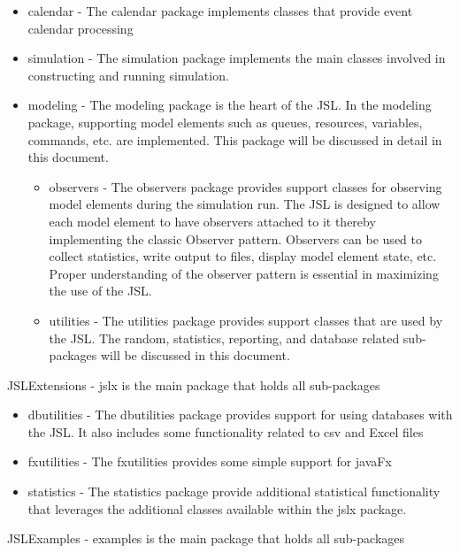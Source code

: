 \documentclass[
]{book}
\providecommand{\tightlist}{%
  \setlength{\itemsep}{0pt}\setlength{\parskip}{0pt}}
\theoremstyle{definition}
\theoremstyle{definition}
\theoremstyle{definition}
\theoremstyle{definition}
\theoremstyle{remark}
\begin{document}
\begin{itemize}
\tightlist
\item
  calendar - The calendar package implements classes that provide event calendar processing
\item
  simulation - The simulation package implements the main classes involved in constructing and running simulation.
\item
  modeling - The modeling package is the heart of the JSL. In the modeling package, supporting model elements such as queues, resources, variables, commands, etc. are implemented. This package will be discussed in detail in this document.

  \begin{itemize}
  \tightlist
  \item
    observers - The observers package provides support classes for observing model elements during the simulation run. The JSL is designed to allow each model element to have observers attached to it thereby implementing the classic Observer pattern. Observers can be used to collect statistics, write output to files, display model element state, etc. Proper understanding of the observer pattern is essential in maximizing the use of the JSL.
  \item
    utilities - The utilities package provides support classes that are used by the JSL. The random, statistics, reporting, and database related sub-packages will be discussed in this document.
  \end{itemize}
\end{itemize}

JSLExtensions - jslx is the main package that holds all sub-packages

\begin{itemize}
\tightlist
\item
  dbutilities - The dbutilities package provides support for using databases with the JSL. It also includes some functionality related to csv and Excel files
\item
  fxutilities - The fxutilities provides some simple support for javaFx
\item
  statistics - The statistics package provide additional statistical functionality that leverages the additional classes available within the jslx package.
\end{itemize}

JSLExamples - examples is the main package that holds all sub-packages
\end{document}
